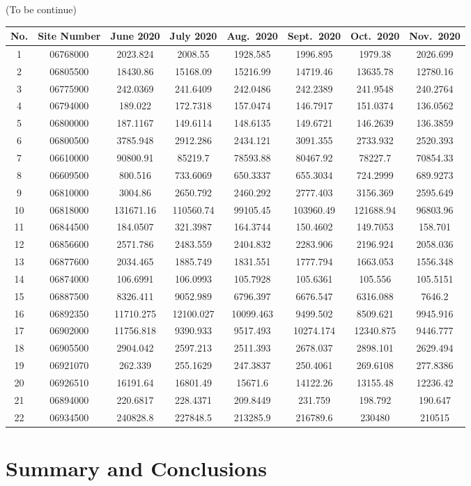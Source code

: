 \documentclass[12pt,]{article}
\begin{document}
(To be continue)

\begin{longtable}[]{@{}cccccccc@{}}
\toprule
No. & Site Number & June 2020 & July 2020 & Aug.~2020 & Sept.~2020 &
Oct.~2020 & Nov.~2020\tabularnewline
\midrule
\endhead
1 & 06768000 & 2023.824 & 2008.55 & 1928.585 & 1996.895 & 1979.38 &
2026.699\tabularnewline
2 & 06805500 & 18430.86 & 15168.09 & 15216.99 & 14719.46 & 13635.78 &
12780.16\tabularnewline
3 & 06775900 & 242.0369 & 241.6409 & 242.0486 & 242.2389 & 241.9548 &
240.2764\tabularnewline
4 & 06794000 & 189.022 & 172.7318 & 157.0474 & 146.7917 & 151.0374 &
136.0562\tabularnewline
5 & 06800000 & 187.1167 & 149.6114 & 148.6135 & 149.6721 & 146.2639 &
136.3859\tabularnewline
6 & 06800500 & 3785.948 & 2912.286 & 2434.121 & 3091.355 & 2733.932 &
2520.393\tabularnewline
7 & 06610000 & 90800.91 & 85219.7 & 78593.88 & 80467.92 & 78227.7 &
70854.33\tabularnewline
8 & 06609500 & 800.516 & 733.6069 & 650.3337 & 655.3034 & 724.2999 &
689.9273\tabularnewline
9 & 06810000 & 3004.86 & 2650.792 & 2460.292 & 2777.403 & 3156.369 &
2595.649\tabularnewline
10 & 06818000 & 131671.16 & 110560.74 & 99105.45 & 103960.49 & 121688.94
& 96803.96\tabularnewline
11 & 06844500 & 184.0507 & 321.3987 & 164.3744 & 150.4602 & 149.7053 &
158.701\tabularnewline
12 & 06856600 & 2571.786 & 2483.559 & 2404.832 & 2283.906 & 2196.924 &
2058.036\tabularnewline
13 & 06877600 & 2034.465 & 1885.749 & 1831.551 & 1777.794 & 1663.053 &
1556.348\tabularnewline
14 & 06874000 & 106.6991 & 106.0993 & 105.7928 & 105.6361 & 105.556 &
105.5151\tabularnewline
15 & 06887500 & 8326.411 & 9052.989 & 6796.397 & 6676.547 & 6316.088 &
7646.2\tabularnewline
16 & 06892350 & 11710.275 & 12100.027 & 10099.463 & 9499.502 & 8509.621
& 9945.916\tabularnewline
17 & 06902000 & 11756.818 & 9390.933 & 9517.493 & 10274.174 & 12340.875
& 9446.777\tabularnewline
18 & 06905500 & 2904.042 & 2597.213 & 2511.393 & 2678.037 & 2898.101 &
2629.494\tabularnewline
19 & 06921070 & 262.339 & 255.1629 & 247.3837 & 250.4061 & 269.6108 &
277.8386\tabularnewline
20 & 06926510 & 16191.64 & 16801.49 & 15671.6 & 14122.26 & 13155.48 &
12236.42\tabularnewline
21 & 06894000 & 220.6817 & 228.4371 & 209.8449 & 231.759 & 198.792 &
190.647\tabularnewline
22 & 06934500 & 240828.8 & 227848.5 & 213285.9 & 216789.6 & 230480 &
210515\tabularnewline
\bottomrule
\end{longtable}

\newpage

\hypertarget{summary-and-conclusions}{%
\section{Summary and Conclusions}\label{summary-and-conclusions}}
\end{document}
